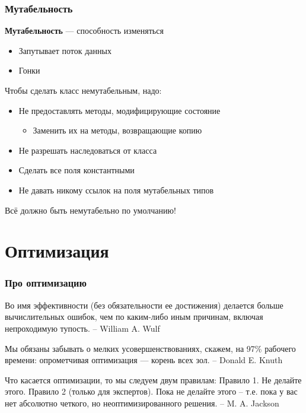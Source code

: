 \documentclass{../mcsslides}
\begin{document}
    \begin{frame}
        \frametitle{Мутабельность}
        \textbf{Мутабельность} --- способность изменяться
        \begin{itemize}
            \item Запутывает поток данных
            \item Гонки
        \end{itemize}
        \vspace{3mm}
        Чтобы сделать класс немутабельным, надо:
        \begin{itemize}
            \item Не предоставлять методы, модифицирующие состояние
            \begin{itemize}
                \item Заменить их на методы, возвращающие копию
            \end{itemize}
            \item Не разрешать наследоваться от класса
            \item Сделать все поля константными
            \item Не давать никому ссылок на поля мутабельных типов
        \end{itemize}
        Всё должно быть немутабельно по умолчанию!
    \end{frame}

    \section{Оптимизация}

    \begin{frame}
        \frametitle{Про оптимизацию}
        Во имя эффективности (без обязательности ее достижения) делается больше вычислительных ошибок, чем по каким-либо иным причинам, включая непроходимую тупость. \newline
        -- William A. Wulf 
    
        \vspace{3mm}
        Мы обязаны забывать о мелких усовершенствованиях, ска­жем, на 97\% рабочего времени: опрометчивая оптимизация --- корень всех зол. \newline
        -- Donald E. Knuth
    
        \vspace{3mm}
        Что касается оптимизации, то мы следуем двум правилам: \newline
        Правило 1. Не делайте этого.  \newline
        Правило 2 (только для экспертов). Пока не делайте этого -- т.е. пока у вас нет абсолютно четкого, но неоптимизированного решения. \newline
        -- M. A. Jackson
    \end{frame}
\end{document}
